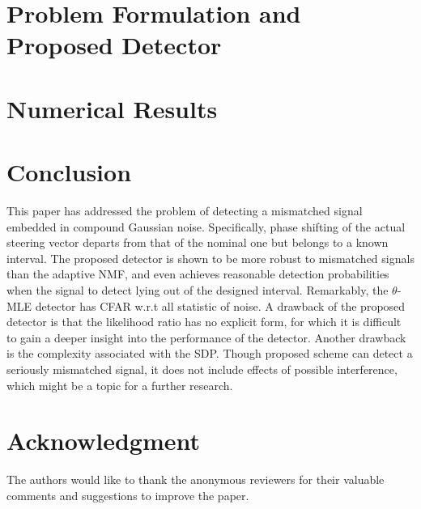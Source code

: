 \documentclass[journal]{IEEEtran}
\begin{document}
\section{Problem Formulation and Proposed Detector}




\section{Numerical Results}


\section{Conclusion}
This paper has addressed the problem of detecting a mismatched signal embedded in compound Gaussian noise.
Specifically, phase shifting of the actual steering vector departs from that of the nominal one but
belongs to a known interval.
The proposed detector is shown to be more robust to mismatched signals than the adaptive NMF,
and even achieves reasonable detection probabilities when the signal to detect lying out of the designed interval.
 Remarkably, the $\theta$-MLE detector has CFAR w.r.t all statistic of noise.
 A drawback of the proposed detector is that the likelihood ratio has no explicit form, for which
 it is difficult to gain a deeper insight into the performance of the detector.
Another drawback is the complexity associated with the SDP.
Though proposed scheme can detect a seriously mismatched signal, it does not include
effects of possible interference, which might be a topic for a further research.
%

\section*{Acknowledgment}
The authors would like to thank the anonymous reviewers for their valuable comments and suggestions to improve the paper.
\ifCLASSOPTIONcaptionsoff
  \newpage
\fi

%
\end{document}
